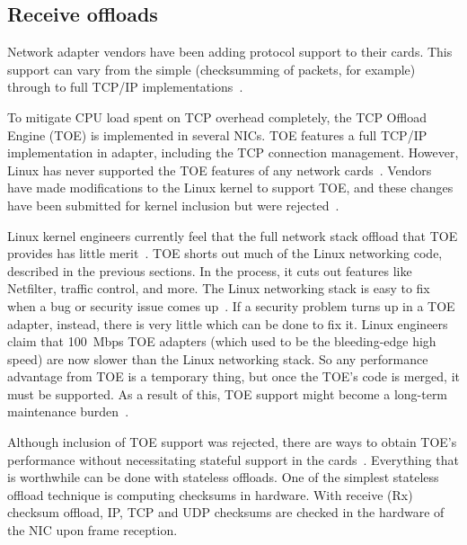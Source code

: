 
\subsection{Receive offloads}\label{sub:linux-ingress-offloads}
Network adapter vendors have been adding protocol support to their cards.
This support can vary from the simple (checksumming of packets, for example)
through to full TCP/IP implementations~\cite{linux-and-tcp-offload-engines}.

To mitigate CPU load spent on TCP overhead completely, the TCP Offload Engine (TOE) is implemented in several NICs.
TOE features a full TCP/IP implementation in adapter, including the TCP connection management.
However, Linux has never supported the TOE features of any network cards~\cite{linux-and-tcp-offload-engines}.
Vendors have made modifications to the Linux kernel to support TOE,
and these changes have been submitted for kernel inclusion but were rejected~\cite{linux-foundation-toe}. 

Linux kernel engineers currently feel that the full network stack offload
that TOE provides has little merit~\cite{linux-foundation-toe}.
TOE shorts out much of the Linux networking code, described in the previous sections.
In the process, it cuts out features like Netfilter, traffic control, and more.
The Linux networking stack is easy to fix when a bug or security issue comes up~\cite{linux-and-tcp-offload-engines}.
If a security problem turns up in a TOE adapter, instead, there is very little which can be done to fix it.
Linux engineers claim that 100~Mbps TOE adapters
(which used to be the bleeding-edge high speed)
are now slower than the Linux networking stack.
So any performance advantage from TOE is a temporary thing, but once the TOE's code is merged, it must be supported.
As a result of this, TOE support might become a long-term maintenance burden~\cite{linux-and-tcp-offload-engines}.

Although inclusion of TOE support was rejected, there are ways to obtain TOE's performance without
necessitating stateful support in the cards~\cite{linux-and-tcp-offload-engines}.
Everything that is worthwhile can be done with stateless offloads.
One of the simplest stateless offload technique is computing checksums in hardware.
With receive (Rx) checksum offload, IP, TCP and UDP checksums are checked in the hardware of the NIC upon frame reception.

